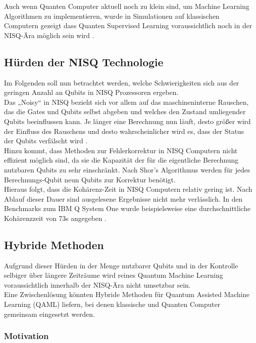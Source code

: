 Auch wenn Quanten Computer aktuell noch zu klein sind, um Machine Learning Algorithmen zu implementieren, wurde in Simulationen auf klassischen Computern gezeigt dass Quanten Supervised Learning voraussichtlich noch in der NISQ-Ära möglich sein wird \cite{chen2020variational}.\\ 


\subsection{Hürden der NISQ Technologie}
Im Folgenden soll nun betrachtet werden, welche Schwierigkeiten sich aus der geringen Anzahl an Qubits in NISQ Prozessoren ergeben. \\

Das „Noisy“ in NISQ bezieht sich vor allem auf das maschineninterne Rauschen, das die Gates und Qubits selbst abgeben und welches den Zustand umliegender Qubits beeinflussen kann. Je länger eine Berechnung nun läuft, desto größer wird der Einfluss des Rauschens und desto wahrscheinlicher wird es, dass der Status der Qubits verfälscht wird \cite{murali2019noise}. \\

Hinzu kommt, dass Methoden zur Fehlerkorrektur in NISQ Computern nicht effizient möglich sind, da sie die Kapazität der für die eigentliche Berechnung nutzbaren Qubits zu sehr einschränkt. Nach Shor's Algorithmus werden für jedes Berechnungs-Qubit neun Qubits zur Korrektur benötigt.
\\
Hieraus folgt, dass die Kohärenz-Zeit in NISQ Computern relativ gering ist. Nach Ablauf dieser Dauer sind ausgelesene Ergebnisse nicht mehr verlässlich. 
In den Benchmarks zum IBM Q System One wurde beispielsweise eine durchschnittliche Kohärenzzeit von 73\textmu s angegeben \cite{benchmarksIBM}.


\subsection{Hybride Methoden}
Aufgrund dieser Hürden in der Menge nutzbarer Qubits und in der Kontrolle selbiger über längere Zeiträume wird reines Quantum Machine Learning voraussichtlich innerhalb der NISQ-Ära nicht umsetzbar sein.\\
Eine Zwischenlösung könnten Hybride Methoden für Quantum Assisted Machine Learning (QAML) liefern, bei denen klassische und Quanten Computer gemeinsam eingesetzt werden.


\label{subsec:hybrid}
\subsubsection{Motivation}

